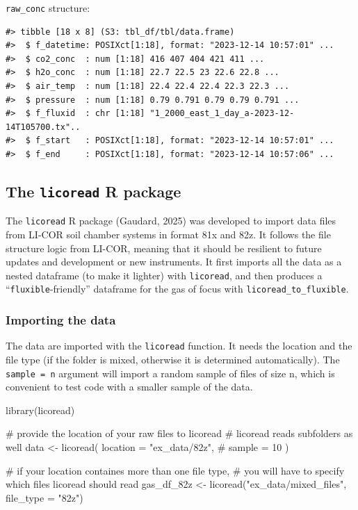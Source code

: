 \documentclass[
  letterpaper,
  DIV=11,
  numbers=noendperiod]{scrartcl}
\newenvironment{Shaded}{\begin{snugshade}}{\end{snugshade}}
\newcommand{\AttributeTok}[1]{\textcolor[rgb]{0.40,0.45,0.13}{#1}}
\newcommand{\CommentTok}[1]{\textcolor[rgb]{0.37,0.37,0.37}{#1}}
\newcommand{\FunctionTok}[1]{\textcolor[rgb]{0.28,0.35,0.67}{#1}}
\newcommand{\NormalTok}[1]{\textcolor[rgb]{0.00,0.23,0.31}{#1}}
\newcommand{\OtherTok}[1]{\textcolor[rgb]{0.00,0.23,0.31}{#1}}
\newcommand{\StringTok}[1]{\textcolor[rgb]{0.13,0.47,0.30}{#1}}
\begin{document}
\texttt{raw\_conc} structure:

\begin{verbatim}
#> tibble [18 x 8] (S3: tbl_df/tbl/data.frame)
#>  $ f_datetime: POSIXct[1:18], format: "2023-12-14 10:57:01" ...
#>  $ co2_conc  : num [1:18] 416 407 404 421 411 ...
#>  $ h2o_conc  : num [1:18] 22.7 22.5 23 22.6 22.8 ...
#>  $ air_temp  : num [1:18] 22.4 22.4 22.4 22.3 22.3 ...
#>  $ pressure  : num [1:18] 0.79 0.791 0.79 0.79 0.791 ...
#>  $ f_fluxid  : chr [1:18] "1_2000_east_1_day_a-2023-12-14T105700.tx"..
#>  $ f_start   : POSIXct[1:18], format: "2023-12-14 10:57:01" ...
#>  $ f_end     : POSIXct[1:18], format: "2023-12-14 10:57:06" ...
\end{verbatim}

\subsection{\texorpdfstring{The \texttt{licoread} R
package}{The licoread R package}}\label{sec-licoread}

The \texttt{licoread} R package (Gaudard, 2025) was developed to import
data files from LI-COR soil chamber systems in format 81x and 82z. It
follows the file structure logic from LI-COR, meaning that it should be
resilient to future updates and development or new instruments. It first
imports all the data as a nested dataframe (to make it lighter) with
\texttt{licoread}, and then produces a ``\texttt{fluxible}-friendly''
dataframe for the gas of focus with \texttt{licoread\_to\_fluxible}.

\subsubsection{Importing the data}\label{importing-the-data}

The data are imported with the \texttt{licoread} function. It needs the
location and the file type (if the folder is mixed, otherwise it is
determined automatically). The \texttt{sample\ =\ n} argument will
import a random sample of files of size n, which is convenient to test
code with a smaller sample of the data.

\begin{Shaded}
\begin{Highlighting}[]
\FunctionTok{library}\NormalTok{(licoread)}

\CommentTok{\# provide the location of your raw files to licoread}
\CommentTok{\# licoread reads subfolders as well}
\NormalTok{data }\OtherTok{\textless{}{-}} \FunctionTok{licoread}\NormalTok{(}
  \AttributeTok{location =} \StringTok{"ex\_data/82z"}\NormalTok{,}
  \CommentTok{\# sample = 10}
\NormalTok{  )}

\CommentTok{\# if your location containes more than one file type,}
\CommentTok{\# you will have to specify which files licoread should read}
\NormalTok{gas\_df\_82z }\OtherTok{\textless{}{-}} \FunctionTok{licoread}\NormalTok{(}\StringTok{"ex\_data/mixed\_files"}\NormalTok{, }\AttributeTok{file\_type =} \StringTok{"82z"}\NormalTok{)}
\end{Highlighting}
\end{Shaded}
\end{document}
